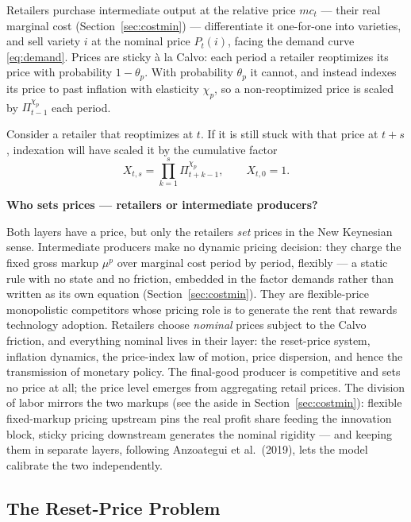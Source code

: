\documentclass[11pt]{article}
\newcommand{\intuition}[2]{%
  \par\medskip\noindent\hspace*{\fill}%
  \colorbox{intuitionblue}{\parbox{0.94\linewidth}{\textbf{#1}\par\smallskip #2}}%
  \hspace*{\fill}\par\medskip}
\begin{document}
Retailers purchase intermediate output at the relative price $mc_t$ --- their real
marginal cost (Section~\ref{sec:costmin}) --- differentiate it one-for-one into
varieties, and sell variety $i$ at the nominal price $P_t(i)$, facing the demand
curve \eqref{eq:demand}.
Prices are sticky \`a la Calvo: each period a retailer reoptimizes its price with
probability $1-\theta_p$. With probability $\theta_p$ it cannot, and instead
indexes its price to past inflation with elasticity $\chi_p$, so a non-reoptimized
price is scaled by $\Pi_{t-1}^{\chi_p}$ each period.

Consider a retailer that reoptimizes at $t$. If it is still stuck with that price
at $t+s$, indexation will have scaled it by the cumulative factor
\begin{equation}\label{eq:index}
    X_{t,s} = \prod_{k=1}^{s} \Pi_{t+k-1}^{\chi_p}, \qquad X_{t,0} = 1.
\end{equation}

\intuition{Who sets prices --- retailers or intermediate producers?}{%
Both layers have a price, but only the retailers \emph{set} prices in the New
Keynesian sense. Intermediate producers make no dynamic pricing decision: they
charge the fixed gross markup $\mu^{p}$ over marginal cost period by period,
flexibly --- a static rule with no state and no friction, embedded in the
factor demands rather than written as its own equation
(Section~\ref{sec:costmin}). They are flexible-price monopolistic competitors
whose pricing role is to generate the rent that rewards technology adoption.
Retailers choose \emph{nominal} prices subject to the Calvo friction, and
everything nominal lives in their layer: the reset-price system, inflation
dynamics, the price-index law of motion, price dispersion, and hence the
transmission of monetary policy. The final-good producer is competitive and
sets no price at all; the price level emerges from aggregating retail prices.
The division of labor mirrors the two markups (see the aside in
Section~\ref{sec:costmin}): flexible fixed-markup pricing upstream pins the
real profit share feeding the innovation block, sticky pricing downstream
generates the nominal rigidity --- and keeping them in separate layers,
following Anzoategui et al.\ (2019), lets the model calibrate the two
independently.}

\subsection{The Reset-Price Problem}
\end{document}
